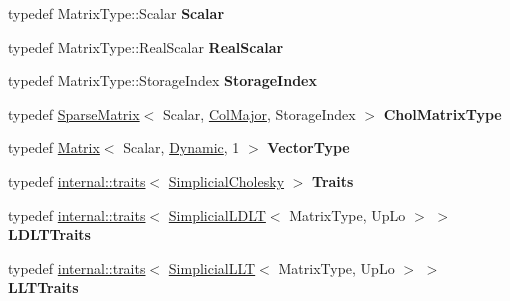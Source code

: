 \begin{DoxyCompactItemize}
typedef Matrix\+Type\+::\+Scalar {\bfseries Scalar}
\item 
\mbox{\label{group___sparse_cholesky___module_a398cad206f425e156e7d4a07c33e1290}} 
typedef Matrix\+Type\+::\+Real\+Scalar {\bfseries Real\+Scalar}
\item 
\mbox{\label{group___sparse_cholesky___module_afdf439e67a29ef03ca6128f36b43a24d}} 
typedef Matrix\+Type\+::\+Storage\+Index {\bfseries Storage\+Index}
\item 
\mbox{\label{group___sparse_cholesky___module_a02a3b97b214580475504aff2c2cceb32}} 
typedef \hyperlink{group___sparse_core___module_class_eigen_1_1_sparse_matrix}{Sparse\+Matrix}$<$ Scalar, \hyperlink{group__enums_ggaacded1a18ae58b0f554751f6cdf9eb13a0cbd4bdd0abcfc0224c5fcb5e4f6669a}{Col\+Major}, Storage\+Index $>$ {\bfseries Chol\+Matrix\+Type}
\item 
\mbox{\label{group___sparse_cholesky___module_ad3f93dabee096aa8393fcb796c90cd78}} 
typedef \hyperlink{group___core___module_class_eigen_1_1_matrix}{Matrix}$<$ Scalar, \hyperlink{namespace_eigen_ad81fa7195215a0ce30017dfac309f0b2}{Dynamic}, 1 $>$ {\bfseries Vector\+Type}
\item 
\mbox{\label{group___sparse_cholesky___module_a55dbf410b228110e130774cbc81f1748}} 
typedef \hyperlink{struct_eigen_1_1internal_1_1traits}{internal\+::traits}$<$ \hyperlink{group___sparse_cholesky___module_class_eigen_1_1_simplicial_cholesky}{Simplicial\+Cholesky} $>$ {\bfseries Traits}
\item 
\mbox{\label{group___sparse_cholesky___module_a712ae422bc52c7645a76e8c11edffc32}} 
typedef \hyperlink{struct_eigen_1_1internal_1_1traits}{internal\+::traits}$<$ \hyperlink{group___sparse_cholesky___module_class_eigen_1_1_simplicial_l_d_l_t}{Simplicial\+L\+D\+LT}$<$ Matrix\+Type, Up\+Lo $>$ $>$ {\bfseries L\+D\+L\+T\+Traits}
\item 
\mbox{\label{group___sparse_cholesky___module_a7ad15981724212e81303ebb215ad83bf}} 
typedef \hyperlink{struct_eigen_1_1internal_1_1traits}{internal\+::traits}$<$ \hyperlink{group___sparse_cholesky___module_class_eigen_1_1_simplicial_l_l_t}{Simplicial\+L\+LT}$<$ Matrix\+Type, Up\+Lo $>$ $>$ {\bfseries L\+L\+T\+Traits}
\end{DoxyCompactItemize}
